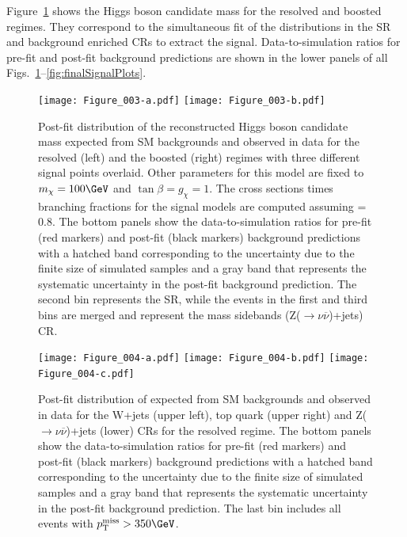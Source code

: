 Figure~\ref{fig:massHbb} shows the Higgs boson candidate mass for the resolved and boosted regimes.  They correspond to the 
simultaneous fit of the \MET distributions in the SR and background enriched CRs to extract the signal.
Data-to-simulation ratios for pre-fit and post-fit background predictions are shown in the lower panels of all Figs.~\ref{fig:massHbb}--\ref{fig:finalSignalPlots}.

\begin{figure}[htbp]
\centering
\texttt{[image: Figure\_003-a.pdf]}
\texttt{[image: Figure\_003-b.pdf]}
\caption{Post-fit distribution of the reconstructed Higgs boson candidate mass expected from SM backgrounds and observed in data for the resolved (left) 
and the boosted (right) regimes with three different \mzp signal points overlaid. Other parameters for this model are fixed to $m_{\chi} = 100\GeV$ and $\tan{\beta} = g_{\chi} = 1$. The cross sections times branching fractions for the signal models are computed assuming \gzp = 0.8. The bottom panels show the data-to-simulation ratios for pre-fit (red markers) and post-fit (black markers) background predictions with a hatched band corresponding to the uncertainty due to the finite size of simulated samples and a gray band that represents the systematic uncertainty in the post-fit background prediction. The second bin represents the SR, while the events in the first and third bins are merged and represent the mass sidebands (Z($\rightarrow\nu\overline{\nu}$)+jets) CR. }

\label{fig:massHbb}
\end{figure}

\begin{figure}[htbp]
\centering
\texttt{[image: Figure\_004-a.pdf]}
\texttt{[image: Figure\_004-b.pdf]}
\texttt{[image: Figure\_004-c.pdf]}

\caption{Post-fit distribution of \MET expected from SM backgrounds and observed in data for the W+jets (upper left), top quark (upper right) and Z($\rightarrow\nu\overline{\nu}$)+jets (lower) CRs for the resolved regime.  The bottom panels show the data-to-simulation ratios for pre-fit (red markers) and post-fit (black markers) background predictions with a hatched band corresponding to the uncertainty due to the finite size of simulated samples and a gray band that represents the systematic uncertainty in the post-fit background prediction. The last bin includes all events with $\MET > 350\GeV$.}
\label{fig:controlregionR}
\end{figure}


